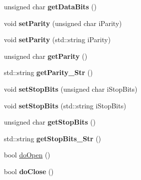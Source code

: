 \begin{DoxyCompactItemize}
\item 
unsigned char {\bfseries get\+Data\+Bits} ()\hypertarget{classport_a4653450ab48e69b23daedefdaf87082a}{}\label{classport_a4653450ab48e69b23daedefdaf87082a}

\item 
void {\bfseries set\+Parity} (unsigned char i\+Parity)\hypertarget{classport_a2e578abf2702fd3fea078fa9c8cf36b3}{}\label{classport_a2e578abf2702fd3fea078fa9c8cf36b3}

\item 
void {\bfseries set\+Parity} (std\+::string i\+Parity)\hypertarget{classport_ad190d97fa0661e762f40d552938c5fe4}{}\label{classport_ad190d97fa0661e762f40d552938c5fe4}

\item 
unsigned char {\bfseries get\+Parity} ()\hypertarget{classport_a6783f06829cc7007eeefa043a0a1883f}{}\label{classport_a6783f06829cc7007eeefa043a0a1883f}

\item 
std\+::string {\bfseries get\+Parity\+\_\+\+Str} ()\hypertarget{classport_a7c339a3de67e131387823837603b9534}{}\label{classport_a7c339a3de67e131387823837603b9534}

\item 
void {\bfseries set\+Stop\+Bits} (unsigned char i\+Stop\+Bits)\hypertarget{classport_a0241c8de6b2f9ce600ef343e94705b91}{}\label{classport_a0241c8de6b2f9ce600ef343e94705b91}

\item 
void {\bfseries set\+Stop\+Bits} (std\+::string i\+Stop\+Bits)\hypertarget{classport_afcffd414fdecf2847fbad056e34479d0}{}\label{classport_afcffd414fdecf2847fbad056e34479d0}

\item 
unsigned char {\bfseries get\+Stop\+Bits} ()\hypertarget{classport_a0329d9757f38df74f3984b97bb2c7815}{}\label{classport_a0329d9757f38df74f3984b97bb2c7815}

\item 
std\+::string {\bfseries get\+Stop\+Bits\+\_\+\+Str} ()\hypertarget{classport_a87617d86fb42ccb4d4c3de19372309dc}{}\label{classport_a87617d86fb42ccb4d4c3de19372309dc}

\item 
bool \hyperlink{classport_acd818c2e27262bc0d0e3312e3d318e4f}{do\+Open} ()
\item 
bool {\bfseries do\+Close} ()\hypertarget{classport_a3613644a1d121ccfdb4f208b9d85f89b}{}\label{classport_a3613644a1d121ccfdb4f208b9d85f89b}


\end{DoxyCompactItemize}
